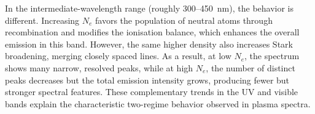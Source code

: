 \documentclass[12pt,a4paper]{article}
\begin{document}
	 In the intermediate-wavelength range (roughly 300--450~nm), the behavior is different. Increasing $N_e$ favors the population of neutral atoms through recombination and modifies the ionisation balance, which enhances the overall emission in this band. However, the same higher density also increases Stark broadening, merging closely spaced lines. As a result, at low $N_e$, the spectrum shows many narrow, resolved peaks, while at high $N_e$, the number of distinct peaks decreases but the total emission intensity grows, producing fewer but stronger spectral features. These complementary trends in the UV and visible bands explain the characteristic two-regime behavior observed in plasma spectra.
	 
	 
%	 
%	 
%	 	
%	 	
\end{document}
